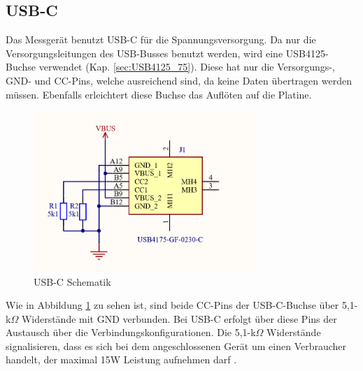 \begin{inhalt}
      \section{USB-C}

      Das Messgerät benutzt USB-C für die Spannungsversorgung. Da nur die Versorgungsleitungen des USB-Busses benutzt werden, wird eine USB4125-Buchse verwendet (Kap. \ref{sec:USB4125_75}). Diese hat nur die Versorgungs-, GND- und CC-Pins, welche ausreichend sind, da keine Daten übertragen werden müssen. Ebenfalls erleichtert diese Buchse das Auflöten auf die Platine.

\begin{figure}[!htb]
\centering
\includegraphics[width=0.75\textwidth]{files/Tobias/pics/Schaltungen/Schematik/USBC_Schematik.PNG}
\caption[USB-C Schematik]{USB-C Schematik}
\label{fig:USB-C_Schematik}
\end{figure}

Wie in Abbildung \ref{fig:USB-C_Schematik} zu sehen ist, sind beide CC-Pins der USB-C-Buchse über 5,1-k$\Omega$ Widerstände mit GND verbunden. Bei USB-C erfolgt über diese Pins der Austausch über die Verbindungskonfigurationen. Die 5,1-k$\Omega$ Widerstände signalisieren, dass es sich bei dem angeschlossenen Gerät um einen Verbraucher handelt, der maximal 15W Leistung aufnehmen darf \cite{USBCPowerDelivery}.

\begin{figure}[H] 
  \centering


\end{figure}
\end{inhalt}
